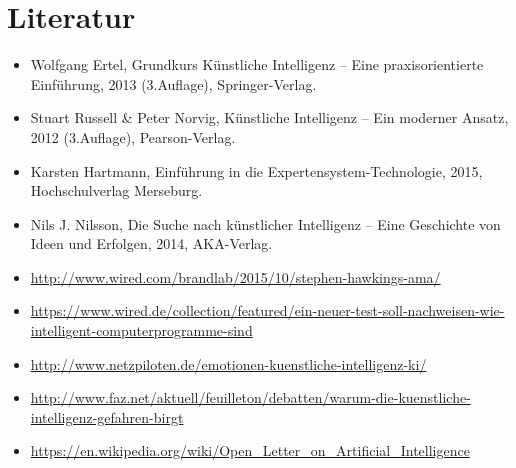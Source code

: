 \section{Literatur}
\begin{itemize}
\item Wolfgang Ertel, Grundkurs Künstliche Intelligenz – Eine praxisorientierte Einführung, 2013 (3.Auflage), Springer-Verlag.
\item Stuart Russell \& Peter Norvig, Künstliche Intelligenz – Ein moderner Ansatz, 2012 (3.Auflage), Pearson-Verlag.
\item Karsten Hartmann, Einführung in die Expertensystem-Technologie, 2015, Hochschulverlag Merseburg.
\item Nils J.
Nilsson, Die Suche nach künstlicher Intelligenz – Eine Geschichte von Ideen und Erfolgen, 2014, AKA-Verlag.
\item \url{http://www.wired.com/brandlab/2015/10/stephen-hawkings-ama/}
\item \url{https://www.wired.de/collection/featured/ein-neuer-test-soll-nachweisen-wie-intelligent-computerprogramme-sind}
\item \url{http://www.netzpiloten.de/emotionen-kuenstliche-intelligenz-ki/}
\item \url{http://www.faz.net/aktuell/feuilleton/debatten/warum-die-kuenstliche-intelligenz-gefahren-birgt}
\item \url{https://en.wikipedia.org/wiki/Open_Letter_on_Artificial_Intelligence}
\end{itemize}
